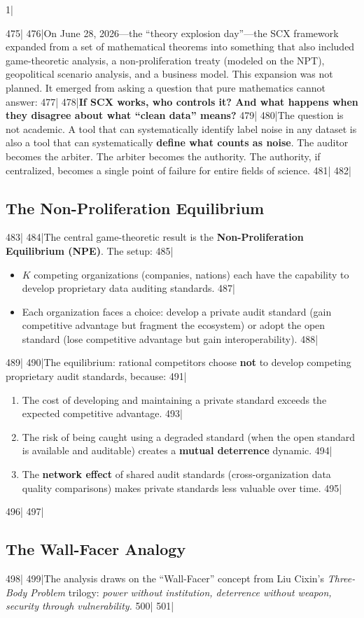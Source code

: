 1|\documentclass[12pt,a4paper]{article}
\begin{document}
475|
476|On June 28, 2026—the ``theory explosion day''—the SCX framework expanded from a set of mathematical theorems into something that also included game-theoretic analysis, a non-proliferation treaty (modeled on the NPT), geopolitical scenario analysis, and a business model. This expansion was not planned. It emerged from asking a question that pure mathematics cannot answer:
477|
478|\textbf{If SCX works, who controls it? And what happens when they disagree about what ``clean data'' means?}
479|
480|The question is not academic. A tool that can systematically identify label noise in any dataset is also a tool that can systematically \textbf{define what counts as noise}. The auditor becomes the arbiter. The arbiter becomes the authority. The authority, if centralized, becomes a single point of failure for entire fields of science.
481|
482|\subsection{The Non-Proliferation Equilibrium}
483|
484|The central game-theoretic result is the \textbf{Non-Proliferation Equilibrium (NPE)}. The setup:
485|\begin{itemize}
486|\item $K$ competing organizations (companies, nations) each have the capability to develop proprietary data auditing standards.
487|\item Each organization faces a choice: develop a private audit standard (gain competitive advantage but fragment the ecosystem) or adopt the open standard (lose competitive advantage but gain interoperability).
488|\end{itemize}
489|
490|The equilibrium: rational competitors choose \textbf{not} to develop competing proprietary audit standards, because:
491|\begin{enumerate}
492|\item The cost of developing and maintaining a private standard exceeds the expected competitive advantage.
493|\item The risk of being caught using a degraded standard (when the open standard is available and auditable) creates a \textbf{mutual deterrence} dynamic.
494|\item The \textbf{network effect} of shared audit standards (cross-organization data quality comparisons) makes private standards less valuable over time.
495|\end{enumerate}
496|
497|\subsection{The Wall-Facer Analogy}
498|
499|The analysis draws on the ``Wall-Facer'' concept from Liu Cixin's \textit{Three-Body Problem} trilogy: \textit{power without institution, deterrence without weapon, security through vulnerability.}
500|
501|
\end{document}
